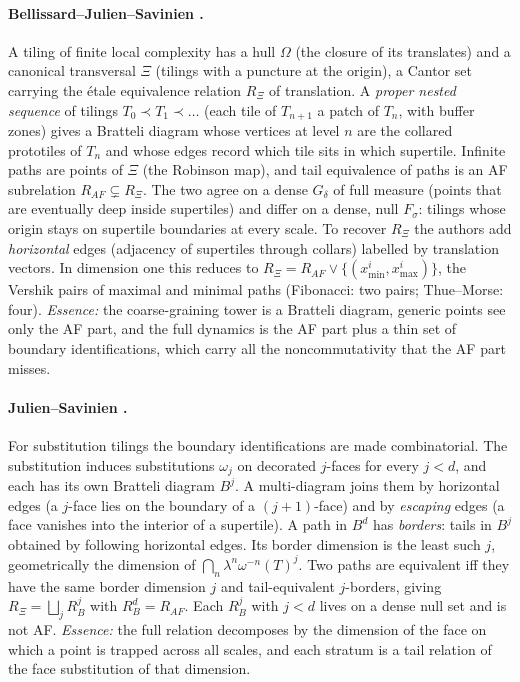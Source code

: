 \label{sec:readings}
\paragraph{Bellissard--Julien--Savinien \cite{BJS}.} A tiling of finite local complexity has a hull $\Omega$ (the closure of its
translates) and a canonical transversal $\Xi$ (tilings with a puncture at the origin), a Cantor set carrying the étale equivalence relation
$R_\Xi$ of translation. A \emph{proper nested sequence} of tilings $T_0\prec T_1\prec\dots$ (each tile of $T_{n+1}$ a patch of $T_n$, with
buffer zones) gives a Bratteli diagram whose vertices at level $n$ are the collared prototiles of $T_n$ and whose edges record which tile
sits in which supertile. Infinite paths are points of $\Xi$ (the Robinson map), and tail equivalence of paths is an AF subrelation
$R_{AF}\subsetneq R_\Xi$. The two agree on a dense $G_\delta$ of full measure (points that are eventually deep inside supertiles) and
differ on a dense, null $F_\sigma$: tilings whose origin stays on supertile boundaries at every scale. To recover $R_\Xi$ the authors add
\emph{horizontal} edges (adjacency of supertiles through collars) labelled by translation vectors. In dimension one this reduces to
$R_\Xi=R_{AF}\vee\{(x^i_{\min},x^i_{\max})\}$, the Vershik pairs of maximal and minimal paths (Fibonacci: two pairs; Thue--Morse: four).
\emph{Essence:} the coarse-graining tower is a Bratteli diagram, generic points see only the AF part, and the full dynamics is the AF part
plus a thin set of boundary identifications, which carry all the noncommutativity that the AF part misses.

\paragraph{Julien--Savinien \cite{JS}.} For substitution tilings the boundary identifications are made combinatorial. The substitution
induces substitutions $\omega_j$ on decorated $j$-faces for every $j<d$, and each has its own Bratteli diagram $B^j$. A multi-diagram joins
them by horizontal edges (a $j$-face lies on the boundary of a $(j{+}1)$-face) and by \emph{escaping} edges (a face vanishes into the interior
of a supertile). A path in $B^d$ has \emph{borders}: tails in $B^j$ obtained by following horizontal edges. Its border dimension is the least
such $j$, geometrically the dimension of $\bigcap_n\lambda^n\omega^{-n}(T)^j$. Two paths are equivalent iff they have the same border
dimension $j$ and tail-equivalent $j$-borders, giving $R_\Xi=\bigsqcup_jR^j_B$ with $R^d_B=R_{AF}$. Each $R^j_B$ with $j<d$ lives on a dense
null set and is not AF. \emph{Essence:} the full relation decomposes by the dimension of the face on which a point is trapped across all
scales, and each stratum is a tail relation of the face substitution of that dimension.

